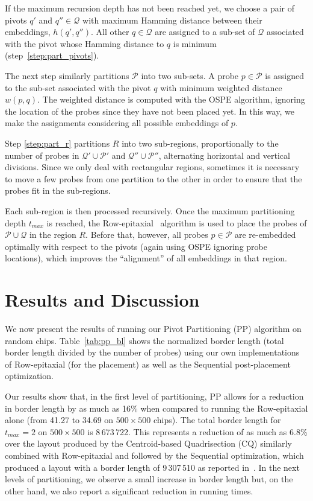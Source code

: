 \documentclass{llncs}
\begin{document}
If the maximum recursion depth has not been reached yet, we choose a pair of
pivots $q'$ and $q'' \in \mathcal{Q}$ with maximum Hamming distance
between their embeddings, $h(q',q'')$. All other $q \in \mathcal{Q}$ are
assigned to a sub-set of $\mathcal{Q}$ associated with the pivot whose
Hamming distance to $q$ is minimum (step~\ref{step:part_pivots}).

The next step similarly partitions $\mathcal{P}$ into two sub-sets. A probe
$p \in \mathcal{P}$ is assigned to the sub-set associated with the pivot $q$
with minimum weighted distance $w(p,q)$. The weighted distance is computed
with the OSPE algorithm, ignoring the location of the probes since they have
not been placed yet. In this way, we make the assignments considering all
possible embeddings of $p$.

Step \ref{step:part_r} partitions $R$ into two sub-regions, proportionally to
the number of probes in $\mathcal{Q}' \cup \mathcal{P}'$ and $\mathcal{Q}''
\cup \mathcal{P}''$, alternating horizontal and vertical divisions.  Since we
only deal with rectangular regions, sometimes it is necessary to move a few
probes from one partition to the other in order to ensure that the probes fit
in the sub-regions.

Each sub-region is then processed recursively. Once the maximum partitioning
depth $t_{max}$ is reached, the Row-epitaxial~\cite{KAHNG03A} algorithm is
used to place the probes of $\mathcal{P} \cup \mathcal{Q}$ in the region $R$.
Before that, however, all probes $p \in \mathcal{P}$ are re-embedded optimally
with respect to the pivots (again using OSPE ignoring probe locations),
which improves the ``alignment'' of all embeddings in that region.

\section{Results and Discussion}
\label{sec:results}

We now present the results of running our Pivot Partitioning (PP) algorithm on
random chips. Table~\ref{tab:pp_bl} shows the normalized border length (total
border length divided by the number of probes) using our own implementations
of Row-epitaxial (for the placement) as well as the Sequential post-placement
optimization.

Our results show that, in the first level of partitioning, PP allows for a
reduction in border length by as much as 16\% when compared to running the
Row-epitaxial alone (from 41.27 to 34.69 on $500\times 500$ chips). The total
border length for $t_{max}=2$ on $500\times 500$ is 8\,673\,722. This
represents a reduction of as much as 6.8\% over the layout produced by the
Centroid-based Quadrisection (CQ) similarly combined with Row-epitaxial and
followed by the Sequential optimization, which produced a layout with a border
length of 9\,307\,510 as reported in~\cite{KAHNG03B}. In the next levels of
partitioning, we observe a small increase in border length but, on the other
hand, we also report a significant reduction in running times.
\end{document}
